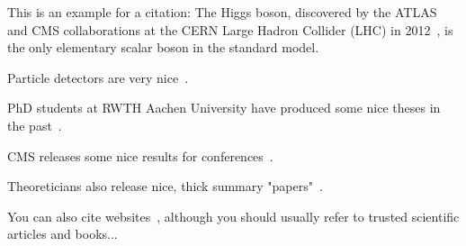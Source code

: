 \label{sec:theory}

This is an example for a citation:
The Higgs boson, discovered by the ATLAS and CMS collaborations at the CERN Large Hadron Collider (LHC) in 2012~\cite{ATLAS:2012yve,CMS:2012qbp}, is the only elementary scalar boson in the standard model.

Particle detectors are very nice~\cite{Kolanoski:2016gyf}.

PhD students at RWTH Aachen University have produced some nice theses in the past~\cite{Rieger:2019rgc}.

CMS releases some nice results for conferences~\cite{CMS-PAS-SMP-22-009}.

Theoreticians also release nice, thick summary "papers"~\cite{LHCHiggsCrossSectionWorkingGroup:2016ypw}.

You can also cite websites~\cite{Guardian}, although you should usually refer to trusted scientific articles and books...